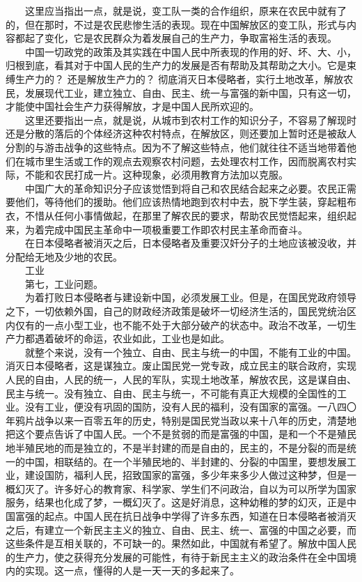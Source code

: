 \documentclass[cn,11pt,chinese]{elegantbook}
\begin{document}
　　这里应当指出一点，就是说，变工队一类的合作组织，原来在农民中就有了的，但在那时，不过是农民悲惨生活的表现。现在中国解放区的变工队，形式与内容都起了变化，它是农民群众为着发展自己的生产力，争取富裕生活的表现。\\
　　中国一切政党的政策及其实践在中国人民中所表现的作用的好、坏、大、小，归根到底，看其对于中国人民的生产力的发展是否有帮助及其帮助之大小。它是束缚生产力的？ 还是解放生产力的？ 彻底消灭日本侵略者，实行土地改革，解放农民，发展现代工业，建立独立、自由、民主、统一与富强的新中国，只有这一切，才能使中国社会生产力获得解放，才是中国人民所欢迎的。\\
　　这里还要指出一点，就是说，从城市到农村工作的知识分子，不容易了解现时还是分散的落后的个体经济这种农村特点，在解放区，则还要加上暂时还是被敌人分割的与游击战争的这些特点。因为不了解这些特点，他们就往往不适当地带着他们在城市里生活或工作的观点去观察农村问题，去处理农村工作，因而脱离农村实际，不能和农民打成一片。这种现象，必须用教育方法加以克服。\\
　　中国广大的革命知识分子应该觉悟到将自己和农民结合起来之必要。农民正需要他们，等待他们的援助。他们应该热情地跑到农村中去，脱下学生装，穿起粗布衣，不惜从任何小事情做起，在那里了解农民的要求，帮助农民觉悟起来，组织起来，为着完成中国民主革命中一项极重要工作即农村民主革命而奋斗。\\
　　在日本侵略者被消灭之后，日本侵略者及重要汉奸分子的土地应该被没收，并分配给无地及少地的农民。\\
　　工业\\
　　第七，工业问题。\\
　　为着打败日本侵略者与建设新中国，必须发展工业。但是，在国民党政府领导之下，一切依赖外国，自己的财政经济政策是破坏一切经济生活的，国民党统治区内仅有的一点小型工业，也不能不处于大部分破产的状态中。政治不改革，一切生产力都遇着破坏的命运，农业如此，工业也是如此。\\
　　就整个来说，没有一个独立、自由、民主与统一的中国，不能有工业的中国。消灭日本侵略者，这是谋独立。废止国民党一党专政，成立民主的联合政府，实现人民的自由，人民的统一，人民的军队，实现土地改革，解放农民，这是谋自由、民主与统一。没有独立、自由、民主与统一，不可能有真正大规模的全国性的工业。没有工业，便没有巩固的国防，没有人民的福利，没有国家的富强。一八四〇年鸦片战争以来一百零五年的历史，特别是国民党当政以来十八年的历史，清楚地把这个要点告诉了中国人民。一个不是贫弱的而是富强的中国，是和一个不是殖民地半殖民地的而是独立的，不是半封建的而是自由的，民主的，不是分裂的而是统一的中国，相联结的。在一个半殖民地的、半封建的、分裂的中国里，要想发展工业，建设国防，福利人民，招致国家的富强，多少年来多少人做过这种梦，但是一概幻灭了。许多好心的教育家、科学家、学生们不问政治，自以为可以所学为国家服务，结果也化成了梦，一概幻灭了。这是好消息，这种幼稚的梦的幻灭，正是中国富强的起点。中国人民在抗日战争中学得了许多东西，知道在日本侵略者被消灭之后，有建立一个新民主主义的独立、自由、民主、统一、富强的中国之必要，而这些条件是互相关联的，不可缺一的。果然如此，中国就有希望了。解放中国人民的生产力，使之获得充分发展的可能性，有待于新民主主义的政治条件在全中国境内的实现。这一点，懂得的人是一天一天的多起来了。\\
\end{document}
